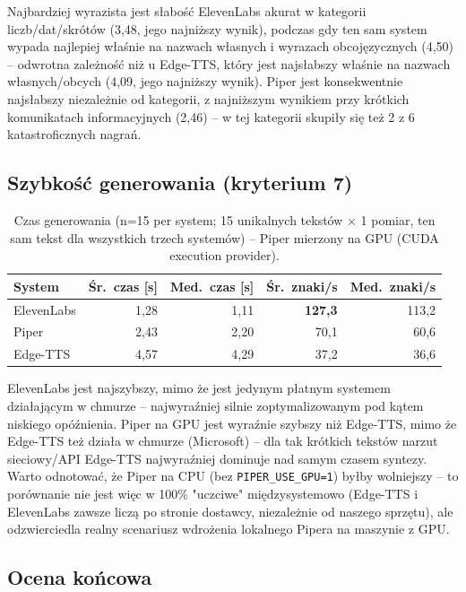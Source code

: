 \documentclass{article}
\begin{document}
Najbardziej wyrazista jest słabość ElevenLabs akurat w kategorii liczb/dat/skrótów (3,48, jego
najniższy wynik), podczas gdy ten sam system wypada najlepiej właśnie na nazwach własnych i
wyrazach obcojęzycznych (4,50) -- odwrotna zależność niż u Edge-TTS, który jest najsłabszy
właśnie na nazwach własnych/obcych (4,09, jego najniższy wynik). Piper jest konsekwentnie
najsłabszy niezależnie od kategorii, z najniższym wynikiem przy krótkich komunikatach
informacyjnych (2,46) -- w tej kategorii skupiły się też 2 z 6 katastroficznych nagrań.

\subsection{Szybkość generowania (kryterium 7)}

\begin{table}[h]
\centering
\begin{tabular}{lrrrr}
\toprule
System & Śr.~czas [s] & Med.~czas [s] & Śr.~znaki/s & Med.~znaki/s \\
\midrule
ElevenLabs & 1,28 & 1,11 & \textbf{127,3} & 113,2 \\
Piper      & 2,43 & 2,20 & 70,1  & 60,6 \\
Edge-TTS   & 4,57 & 4,29 & 37,2  & 36,6 \\
\bottomrule
\end{tabular}
\caption{Czas generowania (n=15 per system; 15 unikalnych tekstów $\times$ 1 pomiar, ten sam
tekst dla wszystkich trzech systemów) -- Piper mierzony na GPU (CUDA execution provider).}
\end{table}

ElevenLabs jest najszybszy, mimo że jest jedynym płatnym systemem działającym w chmurze --
najwyraźniej silnie zoptymalizowanym pod kątem niskiego opóźnienia. Piper na GPU jest wyraźnie
szybszy niż Edge-TTS, mimo że Edge-TTS też działa w chmurze (Microsoft) -- dla tak krótkich
tekstów narzut sieciowy/API Edge-TTS najwyraźniej dominuje nad samym czasem syntezy. Warto
odnotować, że Piper na CPU (bez \texttt{PIPER\_USE\_GPU=1}) byłby wolniejszy -- to porównanie
nie jest więc w 100\% "uczciwe" międzysystemowo (Edge-TTS i ElevenLabs zawsze liczą po stronie
dostawcy, niezależnie od naszego sprzętu), ale odzwierciedla realny scenariusz wdrożenia
lokalnego Pipera na maszynie z GPU.

\subsection{Ocena końcowa}
\end{document}
